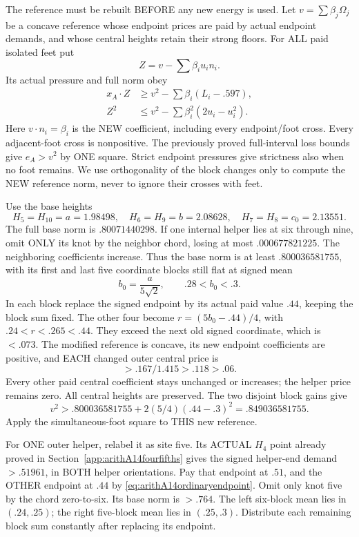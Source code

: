 \documentclass[11pt]{article}
\begin{document}
The reference must be rebuilt BEFORE any
new energy is used.
Let \(v=\sum\beta_j\Omega_j\) be a concave
reference whose endpoint prices are paid
by actual endpoint demands, and whose
central heights retain their strong floors.
For ALL paid isolated feet put
\[
                         Z=v-\sum\beta_i u_i n_i .
\]
Its actual pressure and full norm obey
\[
 \begin{split}
 x_A\cdot Z&\ge v^2-\sum\beta_i(L_i-.597),\\
 Z^2&\le v^2-\sum\beta_i^2(2u_i-u_i^2).
 \end{split}
\]
Here \(v\cdot n_i=\beta_i\) is the NEW
coefficient, including every endpoint/foot
cross.  Every adjacent-foot cross is
nonpositive.
The previously proved full-interval loss
bounds give \(e_A>v^2\) by ONE square.
Strict endpoint pressures give strictness
also when no foot remains.
We use orthogonality of the block changes
only to compute the NEW reference norm,
never to ignore their crosses with feet.

Use the base heights
\[
 H_5=H_{10}=a=1.98498,\quad
 H_6=H_9=b=2.08628,\quad
 H_7=H_8=c_0=2.13551 .
\]
The full base norm is \(.80071440298\).
If one internal helper lies at six through
nine, omit ONLY its knot by the neighbor
chord, losing at most \(.000677821225\).
The neighboring coefficients increase.
Thus the base norm is at least
\(.800036581755\), with its first and
last five coordinate blocks still flat
at signed mean
\[
                           b_0={\frac{a}{5\sqrt2}},\qquad .28<b_0<.3 .
\]
In each block replace the signed endpoint
by its actual paid value \(.44\), keeping
the block sum fixed.
The other four become
\(r=(5b_0-.44)/4\), with
\(.24<r<.265<.44\).
They exceed the next old signed coordinate,
which is \(<.073\).
The modified reference is concave, its
new endpoint coefficients are positive,
and EACH changed outer central price is
\[
                    >.167/1.415>.118>.06 .
\]
Every other paid central coefficient stays
unchanged or increases; the helper price
remains zero.
All central heights are preserved.
The two disjoint block gains give
\[
              v^2>.800036581755+
                            2(5/4)(.44-.3)^2=.849036581755 .
\tag{A14ord0}\label{eq:arithA14ordinarynoouter}
\]
Apply the simultaneous-foot square to
THIS new reference.

For ONE outer helper, relabel it as site
five.  Its ACTUAL \(H_4\) point already
proved in Section~\ref{app:arithA14fourfifths}
gives the signed helper-end demand \(>.51961\),
in BOTH helper orientations.
Pay that endpoint at \(.51\), and the
OTHER endpoint at \(.44\) by
\eqref{eq:arithA14ordinaryendpoint}.
Omit only knot five by the chord zero-to-six.
Its base norm is \(>.764\).
The left six-block mean lies in \((.24,.25)\);
the right five-block mean lies in \((.25,.3)\).
Distribute each remaining block sum
constantly after replacing its endpoint.
\end{document}
